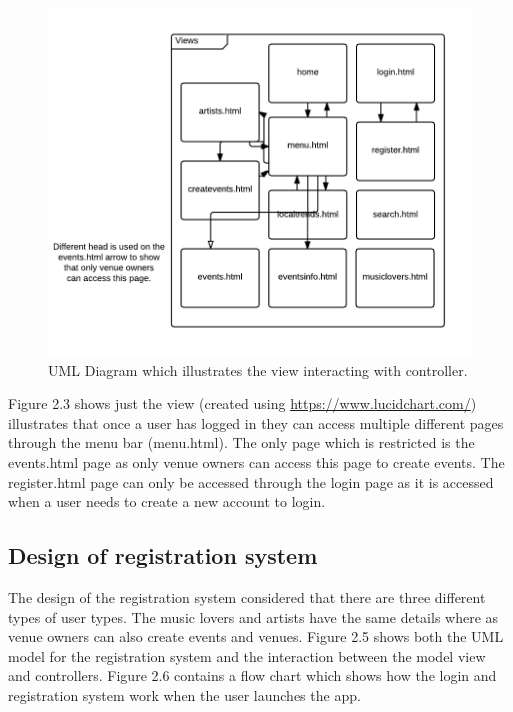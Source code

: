\begin{figure}[H]
\includegraphics[width=\textwidth,height=\textheight,keepaspectratio]{images/va}
\caption{UML Diagram which illustrates the view interacting with controller.}
\end{figure}
Figure 2.3 shows just the view (created using \url{https://www.lucidchart.com/}) illustrates that once a user has logged in they can access multiple different pages through the menu bar (menu.html). The only page which is restricted is the events.html page as only venue owners can access this page to create events. The register.html page can only be accessed through the login page as it is accessed when a user needs to create a new account to login.

\subsection{Design of registration system}
The design of the registration system considered that there are three different types of user types. The music lovers and artists have the same details where as venue owners can also create events and venues. Figure 2.5 shows both the UML model for the registration system and the interaction between the model view and controllers. Figure 2.6  contains a flow chart which shows how the login and registration system work when the user launches the app.

